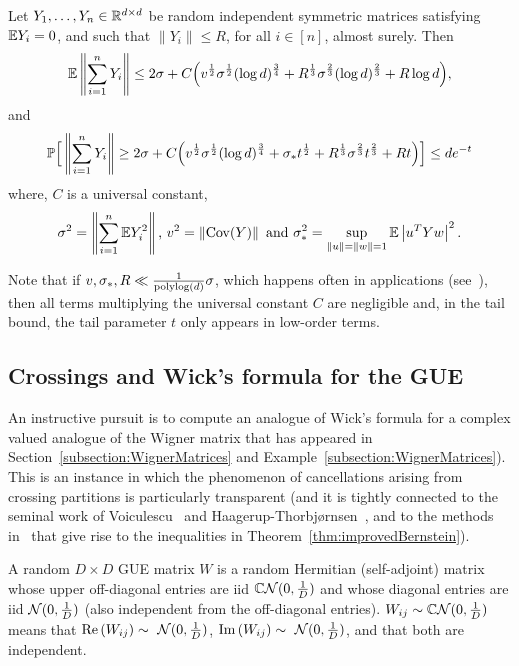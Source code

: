 \begin{theorem} \label{thm:improvedBernstein}
Let $Y_1,\dots,Y_n\in\mathbb{R}^{d\times d}$ be random independent symmetric matrices satisfying $\mathbb{E} Y_i=0$, and such that $\|Y_i\|\leq R$, for all $i\in[n]$, almost surely. Then
\[
\mathbb{E} \left\| \sum_{i=1}^n Y_i  \right\| \leq 2\sigma + C \Big( v^{\frac12}\sigma^{\frac12}(\log d)^\frac34 + R^{\frac13}\sigma^{\frac23}(\log d)^\frac23 + R \log d \Big),
\]
and
\[
\mathbb{P}\Big[  \left\| \sum_{i=1}^n Y_i  \right\| \geq 2\sigma + C \Big( v^{\frac12}\sigma^{\frac12}(\log d)^\frac34 + \sigma_\ast t^{\frac12}+ R^{\frac13}\sigma^{\frac23}t^\frac23 + R t \Big)    \Big] \leq de^{-t}
\]
where, $C$ is a universal constant, 
\begin{equation}
\sigma^2 = \left\|  \sum_{i=1}^n \mathbb{E} Y_i^2   \right\| \text{, } v^2 = \left\| \mathrm{Cov}(Y) \right\| \text{ and } \sigma_\ast^2 = \sup_{\|u\|=\|w\|=1}\mathbb{E} \left| u^TYw \right|^2.
\end{equation}
\end{theorem}

Note that if $v,\sigma_\ast,R\ll \frac{1}{\mathrm{polylog}(d)}\sigma$, which happens often in applications (see~\cite{Bandeiraetal_FreeProbability,Tatianaetal_Universality}), then all terms multiplying the universal constant $C$ are negligible and, in the tail bound, the tail parameter $t$ only appears in low-order terms.



\subsection{Crossings and Wick's formula for the GUE}

An instructive pursuit is to compute an analogue of Wick's formula for a complex valued analogue of the Wigner matrix that has appeared in Section~\ref{subsection:WignerMatrices} and Example~\ref{subsection:WignerMatrices}). This is an instance in which the phenomenon of cancellations arising from crossing partitions is particularly transparent (and it is tightly connected to the seminal work of Voiculescu~\cite{Voiculescu1991} and Haagerup-Thorbj{\o}rnsen~\cite{HaagerupThorbjornsen2005}, and to the methods in~\cite{Bandeiraetal_FreeProbability} that give rise to the inequalities in Theorem~\ref{thm:improvedBernstein}).

\begin{definition}
A random $D
\times D$ GUE matrix $W$ is a random Hermitian (self-adjoint) matrix whose upper off-diagonal entries are iid $\mathbb{C}\mathcal{N}(0,\frac1D)$ and whose diagonal entries are iid $\mathcal{N}(0,\frac1D)$ (also independent from the off-diagonal entries). $W_{ij}\sim \mathbb{C}\mathcal{N}(0,\frac1D)$ means that $\operatorname{Re}\left(W_{ij}\right) \sim ~\mathcal{N}(0,\frac1D)$, $\operatorname{Im}\left(W_{ij}\right) \sim ~\mathcal{N}(0,\frac1D)$, and that both are independent.
\end{definition}

